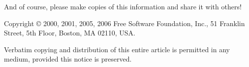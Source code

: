 \documentclass[twoside,12pt]{article}
\begin{document}
And of course, please make copies of this information and share it with
others!

\vspace{0.3in}

{\small

\noindent Copyright \copyright\/ 2000, 2001, 2005, 2006 Free Software Foundation, Inc., 51
Franklin Street, 5th Floor, Boston, MA 02110, USA.

Verbatim copying and distribution of this entire article is permitted
in any medium, provided this notice is preserved.
}
\end{document}
